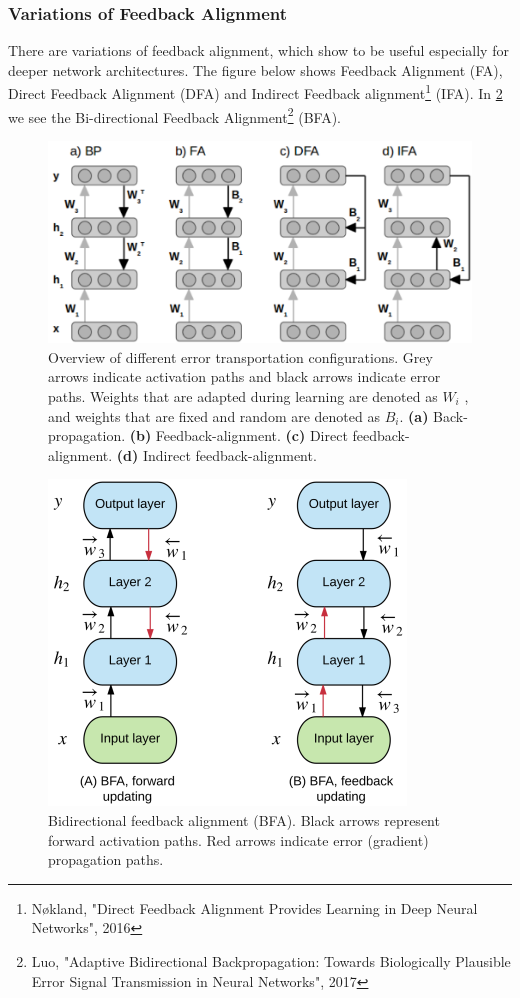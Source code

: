\documentclass[main]{subfiles}
\begin{document}
\subsubsection{Variations of Feedback Alignment}
There are variations of feedback alignment, which show to be useful especially for deeper network architectures. The figure below shows Feedback Alignment (FA), Direct Feedback Alignment (DFA) and Indirect Feedback alignment\footnote{Nøkland, "Direct Feedback Alignment Provides Learning in Deep Neural Networks", 2016} (IFA).  In \cref{fig:bidirect_feedbackalignment} we see the Bi-directional Feedback Alignment\footnote{Luo, "Adaptive Bidirectional Backpropagation: Towards Biologically Plausible Error Signal Transmission in Neural Networks", 2017} (BFA).

\begin{figure}[H]
	\centering
	\includegraphics[width=0.99\linewidth]{02_TrainingMethodsForDeepANNs/figures/direct_feedbackalignment.png}
	\caption{Overview of different error transportation configurations. Grey arrows indicate activation paths and black arrows indicate error paths. Weights that are adapted during learning are denoted as $W_i$ , and weights that are fixed and random are denoted as $B_i$. \textbf{(a)} Back-propagation. \textbf{(b)} Feedback-alignment. \textbf{(c)} Direct feedback-alignment. \textbf{(d)} Indirect feedback-alignment.}
	\label{fig:direct_feedbackalignment}
\end{figure}

\begin{figure}[H]
	\centering
	\includegraphics[width=0.6\linewidth]{02_TrainingMethodsForDeepANNs/figures/bidirect_feedbackalignment.png}
	\caption{Bidirectional feedback alignment (BFA). Black arrows represent forward activation paths. Red arrows indicate error (gradient) propagation paths.}
	\label{fig:bidirect_feedbackalignment}
\end{figure}
\end{document}

